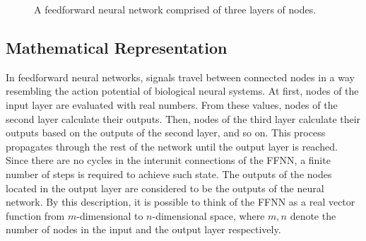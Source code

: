\begin{figure}[ht]
	\centering
	\scriptsize
	\caption[A feedforward neural network.]{A feedforward neural network comprised of three layers of nodes.}
	\label{fig:FFNN}
\end{figure}

\subsection{Mathematical Representation}
In feedforward neural networks, signals travel between connected nodes in a way resembling the action potential of biological neural systems. At first, nodes of the input layer are evaluated with real numbers. From these values, nodes of the second layer calculate their outputs. Then, nodes of the third layer calculate their outputs based on the outputs of the second layer, and so on. This process propagates through the rest of the network until the output layer is reached. Since there are no cycles in the interunit connections of the FFNN, a finite number of steps is required to achieve such state. The outputs of the nodes located in the output layer are considered to be the outputs of the neural network. By this description, it is possible to think of the FFNN as a real vector function from $m$-dimensional to $n$-dimensional space, where $m,n$ denote the number of nodes in the input and the output layer respectively.

